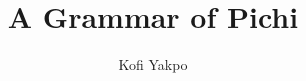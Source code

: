 \author{Kofi Yakpo}
\title{A Grammar of Pichi}
\renewcommand{\lsSeries}{sidl}
\dedication{To Yèni and Fodé}
